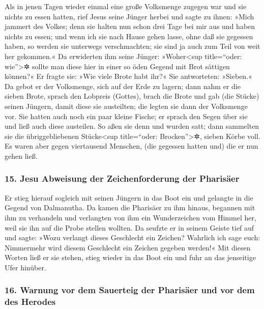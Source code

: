  Als in jenen Tagen wieder einmal eine große Volksmenge
zugegen war und sie nichts zu essen hatten, rief Jesus seine Jünger
herbei und sagte zu ihnen:  »Mich jammert des Volkes; denn
sie halten nun schon drei Tage bei mir aus und haben nichts zu essen;
 und wenn ich sie nach Hause gehen lasse, ohne daß sie
gegessen haben, so werden sie unterwegs verschmachten; sie sind ja auch
zum Teil von weit her gekommen.«  Da erwiderten ihm seine
Jünger: »Woher\textless sup title=``oder: wie''\textgreater✲ sollte man
diese hier in einer so öden Gegend mit Brot sättigen können?«
 Er fragte sie: »Wie viele Brote habt ihr?« Sie
antworteten: »Sieben.«  Da gebot er der Volksmenge, sich
auf der Erde zu lagern; dann nahm er die sieben Brote, sprach den
Lobpreis (Gottes), brach die Brote und gab (die Stücke) seinen Jüngern,
damit diese sie austeilten; die legten sie dann der Volksmenge vor.
 Sie hatten auch noch ein paar kleine Fische; er sprach
den Segen über sie und ließ auch diese austeilen.  So aßen
sie denn und wurden satt; dann sammelten sie die übriggebliebenen
Stücke\textless sup title=``oder: Brocken''\textgreater✲, sieben Körbe
voll.  Es waren aber gegen viertausend Menschen, (die
gegessen hatten und) die er nun gehen ließ.

\hypertarget{jesu-abweisung-der-zeichenforderung-der-pharisuxe4er}{%
\subsubsection{15. Jesu Abweisung der Zeichenforderung der
Pharisäer}\label{jesu-abweisung-der-zeichenforderung-der-pharisuxe4er}}

 Er stieg hierauf sogleich mit seinen Jüngern in das Boot
ein und gelangte in die Gegend von Dalmanutha.  Da kamen
die Pharisäer zu ihm hinaus, begannen mit ihm zu verhandeln und
verlangten von ihm ein Wunderzeichen vom Himmel her, weil sie ihn auf
die Probe stellen wollten.  Da seufzte er in seinem
Geiste tief auf und sagte: »Wozu verlangt dieses Geschlecht ein Zeichen?
Wahrlich ich sage euch: Nimmermehr wird diesem Geschlecht ein Zeichen
gegeben werden!«  Mit diesen Worten ließ er sie stehen,
stieg wieder in das Boot ein und fuhr an das jenseitige Ufer hinüber.

\hypertarget{warnung-vor-dem-sauerteig-der-pharisuxe4er-und-vor-dem-des-herodes}{%
\subsubsection{16. Warnung vor dem Sauerteig der Pharisäer und vor dem
des
Herodes}\label{warnung-vor-dem-sauerteig-der-pharisuxe4er-und-vor-dem-des-herodes}}

